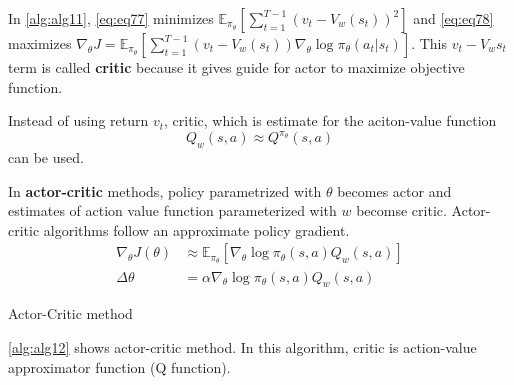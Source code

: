 \documentclass[
	10pt, %
]{article}
\theoremstyle{plain}
\newcommand{\mbb}[1]{\mathbb{#1}}
\newcommand{\tb}[1]{\textbf{#1}}
\numberwithin{equation}{subsection} %
\begin{document}
In \cref{alg:alg11}, \cref{eq:eq77} minimizes $\mbb{E}_{\pi_\theta}[\sum_{t=1}^{T-1} (v_t - V_w(s_t))^2]$ and \cref{eq:eq78} maximizes $\nabla_\theta J = \mbb{E}_{\pi_\theta}[\sum_{t=1}^{T-1}(v_t - V_w(s_t))\nabla_\theta \log {\pi_\theta}(a_t|s_t)]$. This $v_t - V_w{s_t}$ term is called \tb{critic} because it gives guide for actor to maximize objective function.

Instead of using return $v_t$, critic, which is estimate for the aciton-value function $$Q_w(s,a) \approx Q^{\pi_\theta}(s,a)$$ can be used.


In \tb{actor-critic} methods, policy parametrized with $\theta$ becomes actor and estimates of action value function parameterized with $w$ becomse critic.
Actor-critic algorithms follow an approximate policy gradient.
\begin{equation} \label{eq:eq76}
    \begin{aligned}
        \nabla_\theta J(\theta) &\approx \mbb{E}_{\pi_\theta}[\nabla_\theta \log \pi_\theta (s,a) Q_w(s,a)]\\
        \Delta \theta &= \alpha \nabla_\theta \log \pi_\theta(s,a) Q_w(s,a)
    \end{aligned}
\end{equation}

\begin{algorithm} 
\caption{Actor-Critic method} \label{alg:alg12}
\end{algorithm}

\cref{alg:alg12} shows actor-critic method. In this algorithm, critic is action-value approximator function (Q function). 
\end{document}
